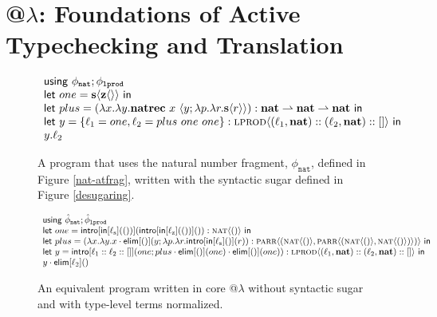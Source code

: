 \documentclass[10pt,preprint]{sigplanconf}
\begin{document}
{\section{@$\lambda$: Foundations of Active Typechecking and Translation}\label{theory}
\newcommand{\F}[1]{{\sf #1}~}
\newcommand{\FF}[1]{{\sf #1}}
\newcommand{\Q}{\FF{Arg}}
\renewcommand{\tnil}[1]{[]}
\newcommand{\ltxt}[1]{\ell_{\text{#1}}}
\begin{figure*}[t]
\small
$
\begin{array}{l}
\F{using} \phi_{\texttt{nat}}; \phi_{\texttt{lprod}}\\
\elet{one}{\tvar{s}\langle\tvar{z}\langle\rangle\rangle}{\\
\elet{plus}{(\lambda x.\lambda y.\tvar{natrec}~x~\langle y; \lambda p.\lambda r.\tvar{s}\langle r\rangle\rangle) : \tvar{nat} \rightharpoonup \tvar{nat} \rightharpoonup \tvar{nat}}{\\
\FF{let}~y = \{\ltxt{1}=one, \ltxt{2}=plus~one~one\} : \ttype{lprod}{(\ltxt{1}, \tvar{nat}) :: (\ltxt{2}, \tvar{nat}) :: []}}}~\FF{in}\\
y.\ell_2
\end{array}
$
\caption{\small A program that uses the natural number fragment, $\phi_\texttt{nat}$, defined in Figure \ref{nat-atfrag}, written with the syntactic sugar defined in Figure \ref{desugaring}.}
\label{nat-sugared}
\end{figure*}
\begin{figure*}[t]
\small
\hspace{-5px}
$
\begin{array}{l}
\F{using} \hat\phi_{\texttt{nat}}; \hat\phi_{\texttt{lprod}}\\
\elet{one}{\FF{intro}[\FF{in}[\ltxt{s}](\tunit)](\FF{intro}[\FF{in}[\ltxt{z}](\tunit)]()) : \ttype{nat}{\tunit}}{\\
\elet{plus}{(\lambda x.\lambda y.x\cdot\FF{elim}[()](y; \lambda p.\lambda r.\FF{intro}[\FF{in}[\ltxt{s}]()](r)) :\ttype{parr}{(\ttype{nat}{\tunit}, \ttype{parr}{(\ttype{nat}{\tunit}, \ttype{nat}{\tunit})})}}{\\
\FF{let}~y = \FF{intro}[\ell_1 :: \ell_2 :: []](one; plus\cdot\FF{elim}[()](one)\cdot\FF{elim}[()](one)) : \ttype{lprod}{(\ltxt{1}, \tvar{nat}) :: (\ltxt{2}, \tvar{nat}) :: []}}}~\FF{in}\\
y\cdot\FF{elim}[\ell_2]()
\end{array}
$
\caption{\small An equivalent program written in core @$\lambda$ without syntactic sugar and with type-level terms normalized.}
\label{nat-desugared}
\end{figure*}
}
\end{document}
